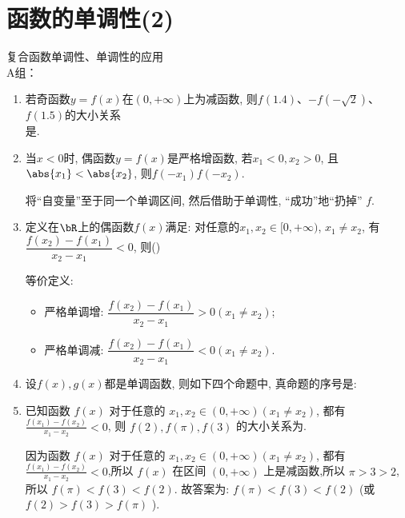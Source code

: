 \section{函数的单调性(2)}
\zsd 复合函数单调性、单调性的应用 \\

A组：
\begin{enumerate}
\item 若奇函数$y=f(x)$在$(0,+\infty)$上为减函数, 则$f(1.4)$、$-f(-\sqrt{2})$、$f(1.5)$的大小关系\\
是. 

\item 当$x<0$时, 偶函数$y=f(x)$是严格增函数, 若$x_1<0,x_2>0$, 且$\abs{x_1}<\abs{x_2}$, 则$f(-x_1)$\blkda[1]{$>$}$f(-x_2)$. 
\begin{jieda}
将``自变量''至于同一个单调区间, 然后借助于单调性, ``成功''地``扔掉'' $f$. 
\end{jieda}

\item 定义在$\bR$上的偶函数$f(x)$满足: 对任意的$x_1,x_2\in[0,+\infty)$, $x_1\neq x_2$, 有$\dfrac{f(x_2)-f(x_1)}{x_2-x_1}<0$, 则\dotfill()
\begin{jieda}
等价定义: 
\begin{itemize}
\item 严格单调增: $\dfrac{f(x_2)-f(x_1)}{x_2-x_1}>0(x_1\neq x_2)$; 
\item 严格单调减: $\dfrac{f(x_2)-f(x_1)}{x_2-x_1}<0(x_1\neq x_2)$. 
\end{itemize}
\end{jieda}


\item 设$f(x), g(x)$都是单调函数, 则如下四个命题中, 真命题的序号是: 

\item 已知函数 $f(x)$ 对于任意的 $x_1, x_2 \in(0,+\infty)\left(x_1 \neq x_2\right)$, 都有 $\frac{f\left(x_1\right)-f\left(x_2\right)}{x_1-x_2}<0$, 则 $f(2), f(\pi), f(3)$ 的大小关系为.
\begin{jieda}
因为函数 $f(x)$ 对于任意的 $x_{1}, x_{2} \in(0,+\infty)\left(x_{1} \neq x_{2}\right)$, 都有 $\frac{f\left(x_{1}\right)-f\left(x_{2}\right)}{x_{1}-x_{2}}<0$,所以 $f(x)$ 在区间 $(0,+\infty)$ 上是减函数,所以 $\pi>3>2$, 所以 $f(\pi)<f(3)<f(2)$.
故答案为: $f(\pi)<f(3)<f(2)$ (或 $f(2)>f(3)>f(\pi)$ ).
\end{jieda}



\end{enumerate}
